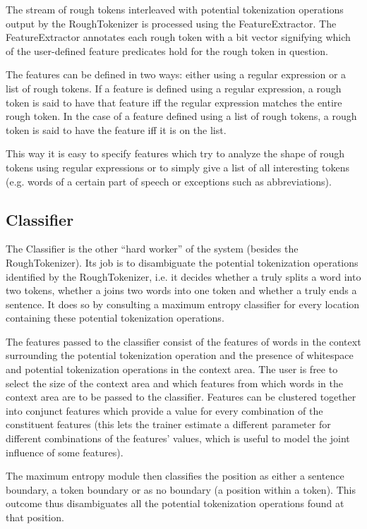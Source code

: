 The stream of rough tokens interleaved with potential tokenization
operations output by the RoughTokenizer is processed using the
FeatureExtractor. The FeatureExtractor annotates each rough token with
a bit vector signifying which of the user-defined feature predicates
hold for the rough token in question.

The features can be defined in two ways: either using a regular
expression or a list of rough tokens. If a feature is defined using a
regular expression, a rough token is said to have that feature iff the
regular expression matches the entire rough token. In the case of a
feature defined using a list of rough tokens, a rough token is said to
have the feature iff it is on the list.

This way it is easy to specify features which try to analyze the shape
of rough tokens using regular expressions or to simply give a list of
all interesting tokens (e.g. words of a certain part of speech or
exceptions such as abbreviations).

\subsection{Classifier}

The Classifier is the other ``hard worker'' of the system (besides the
RoughTokenizer). Its job is to disambiguate the potential tokenization
operations identified by the RoughTokenizer, i.e. it decides whether a
\maysplit{} truly splits a word into two tokens, whether a \mayjoin{}
joins two words into one token and whether a \maybreaksentence{} truly
ends a sentence. It does so by consulting a maximum entropy classifier
for every location containing these potential tokenization operations.

The features passed to the classifier consist of the features of words
in the context surrounding the potential tokenization operation and
the presence of whitespace and potential tokenization operations in
the context area. The user is free to select the size of the context
area and which features from which words in the context area are to be
passed to the classifier. Features can be clustered together into
conjunct features which provide a value for every combination of the
constituent features (this lets the trainer estimate a different
parameter for different combinations of the features' values, which is
useful to model the joint influence of some features).

The maximum entropy module then classifies the position as either a
sentence boundary, a token boundary or as no boundary (a position
within a token). This outcome thus disambiguates all the potential
tokenization operations found at that position.

